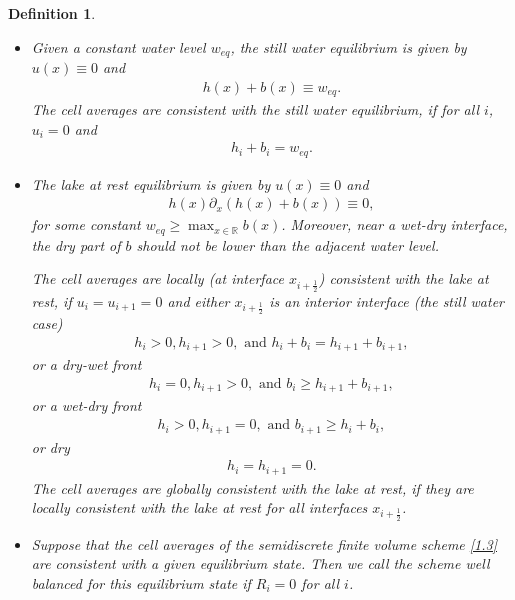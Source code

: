 \documentclass[11pt,a4paper,center,notitlepage]{article}
\numberwithin{equation}{section}
\newtheorem{definition}{Definition}
\begin{document}
\begin{definition}
\label{def2}
\begin{itemize}
\item[i)] Given a constant water level $w_{eq}$, the \emph{still water equilibrium} is given by $u\left(x\right) \equiv 0$ and 
\begin{align}
h\left( x \right) + b\left( x \right) \equiv {w_{eq}}.
\end{align}
The cell averages are consistent with the still water equilibrium, if for all $i$, $u_i = 0$ and 
\begin{align}
h_i + b_i = w_{eq}.
\end{align}
\item[ii)] The \emph{lake at rest equilibrium} is given by $u\left(x\right) \equiv 0$ and 
\begin{align}
h\left( x \right){\partial _x}\left( {h\left( x \right) + b\left( x \right)} \right) \equiv 0,
\end{align}
for some constant $w_{eq} \ge \max _{x\in \mathbb{R}} b\left(x\right)$. Moreover, near a wet-dry interface, the dry part of $b$ should not be lower than the adjacent water level.

The cell averages are \emph{locally} (at interface $x_{i+\frac{1}{2}}$) \emph{consistent with the lake at rest}, if $u_i = u_{i+1}=0$ and either $x_{i+\frac{1}{2}}$ is an interior interface (the still water case)
\begin{align}
{h_i} > 0,{h_{i + 1}} > 0, \mbox{ and } {h_i} + {b_i} = {h_{i + 1}} + {b_{i + 1}},
\end{align}
or a dry-wet front
\begin{align}
{h_i} = 0,{h_{i + 1}} > 0, \mbox{ and } {b_i} \ge {h_{i + 1}} + {b_{i + 1}},
\end{align} 
or a wet-dry front
\begin{align}
{h_i} > 0,{h_{i + 1}} = 0, \mbox{ and } {b_{i + 1}} \ge {h_i} + {b_i},
\end{align}
or dry
\begin{align}
h_i = h_{i+1} = 0.
\end{align}
The cell averages are \emph{globally consistent with the lake at rest}, if they are locally consistent with the lake at rest for all interfaces $x_{i+\frac{1}{2}}$.
\item[iii)] Suppose that the cell averages of the semidiscrete finite volume scheme \eqref{1.3} are consistent with a given equilibrium state. Then we call the scheme \emph{well balanced} for this equilibrium state if $R_i =0$ for all $i$. 
\end{itemize}
\end{definition}
\end{document}
